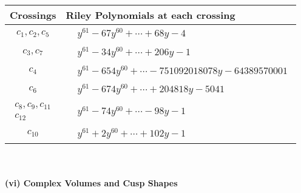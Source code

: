 \documentclass[1p]{elsarticle_modified}
\theoremstyle{definition}
\begin{document}
\begin{tabular}{m{50pt}|m{274pt}}
Crossings & \hspace{64pt}Riley Polynomials at each crossing \\
\hline $$\begin{aligned}c_{1},c_{2},c_{5}\end{aligned}$$&$\begin{aligned}
&y^{61}-67 y^{60}+\cdots+68 y-4
\end{aligned}$\\
\hline $$\begin{aligned}c_{3},c_{7}\end{aligned}$$&$\begin{aligned}
&y^{61}-34 y^{60}+\cdots+206 y-1
\end{aligned}$\\
\hline $$\begin{aligned}c_{4}\end{aligned}$$&$\begin{aligned}
&y^{61}-654 y^{60}+\cdots-751092018078 y-64389570001
\end{aligned}$\\
\hline $$\begin{aligned}c_{6}\end{aligned}$$&$\begin{aligned}
&y^{61}-674 y^{60}+\cdots+204818 y-5041
\end{aligned}$\\
\hline $$\begin{aligned}c_{8},c_{9},c_{11}\\c_{12}\end{aligned}$$&$\begin{aligned}
&y^{61}-74 y^{60}+\cdots-98 y-1
\end{aligned}$\\
\hline $$\begin{aligned}c_{10}\end{aligned}$$&$\begin{aligned}
&y^{61}+2 y^{60}+\cdots+102 y-1
\end{aligned}$\\
\hline
\end{tabular}\\~\\
\newpage\flushleft \textbf{(vi) Complex Volumes and Cusp Shapes}
\end{document}
